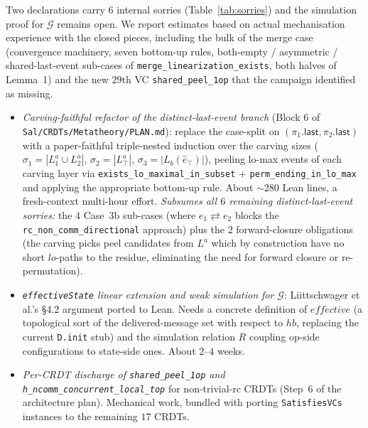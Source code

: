 \documentclass[11pt,a4paper]{article}
\theoremstyle{definition}
\theoremstyle{remark}
\newcommand{\commute}{\mathrel{\rightleftarrows}}
\newcommand{\Emul}{\mathcal{G}}
\begin{document}
Two declarations carry $6$ internal sorries
(Table~\ref{tab:sorries}) and the simulation proof for $\Emul$
remains open. We report estimates based on actual mechanisation
experience with the closed pieces, including the bulk of the
merge case (convergence machinery, seven bottom-up rules,
both-empty / asymmetric / shared-last-event sub-cases of
\texttt{merge\_linearization\_exists}, both halves of Lemma~1)
and the new $29$th VC \texttt{shared\_peel\_1op} that the
campaign identified as missing.

\begin{itemize}[leftmargin=*]
  \item \emph{Carving-faithful refactor of the distinct-last-event
    branch} (Block 6 of \texttt{Sal/CRDTs/Metatheory/PLAN.md}):
    replace the case-split on $(\pi_1.\mathsf{last},
    \pi_2.\mathsf{last})$ with a paper-faithful triple-nested
    induction over the carving sizes
    ($\sigma_1 = |L_1^a \cup L_2^a|$, $\sigma_2 = |L_\top^a|$,
    $\sigma_3 = |L_b(\hat e_\top)|$), peeling lo-max events of
    each carving layer via
    \texttt{exists\_lo\_maximal\_in\_subset} +
    \texttt{perm\_ending\_in\_lo\_max} and applying the appropriate
    bottom-up rule. About $\sim 280$ Lean lines, a fresh-context
    multi-hour effort. \emph{Subsumes all $6$ remaining
    distinct-last-event sorries:} the $4$ Case~3b sub-cases (where
    $e_1 \commute e_2$ blocks the
    \texttt{rc\_non\_comm\_directional} approach) plus the $2$
    forward-closure obligations (the carving picks peel candidates
    from $L^a$ which by construction have no short
    $\mathit{lo}$-paths to the residue, eliminating the need for
    forward closure or re-permutation).
  \item \emph{\texttt{effectiveState} linear extension and weak
    simulation for $\Emul$}: Liittschwager et al.'s §4.2 argument
    ported to Lean. Needs a concrete definition of
    $\mathit{effective}$ (a topological sort of the
    delivered-message set with respect to $\mathit{hb}$, replacing
    the current \texttt{D.init} stub) and the simulation relation
    $R$ coupling op-side configurations to state-side ones. About
    $2$--$4$ weeks.
  \item \emph{Per-CRDT discharge of \texttt{shared\_peel\_1op} and
    \texttt{h\_ncomm\_concurrent\_local\_top}} for non-trivial-rc
    CRDTs (Step~6 of the architecture plan). Mechanical work,
    bundled with porting \texttt{SatisfiesVCs} instances to the
    remaining $17$ CRDTs.
\end{itemize}
\end{document}
